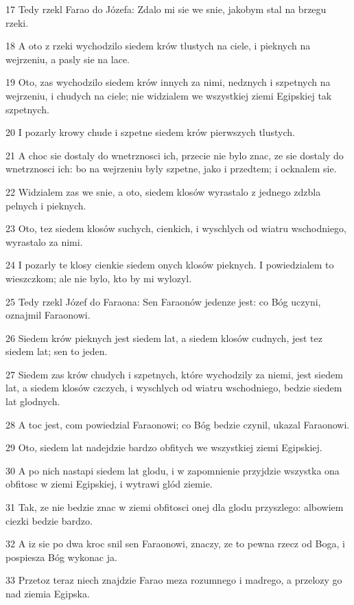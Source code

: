 \par 17 Tedy rzekl Farao do Józefa: Zdalo mi sie we snie, jakobym stal na brzegu rzeki.
\par 18 A oto z rzeki wychodzilo siedem krów tlustych na ciele, i pieknych na wejrzeniu, a pasly sie na lace.
\par 19 Oto, zas wychodzilo siedem krów innych za nimi, nedznych i szpetnych na wejrzeniu, i chudych na ciele; nie widzialem we wszystkiej ziemi Egipskiej tak szpetnych.
\par 20 I pozarly krowy chude i szpetne siedem krów pierwszych tlustych.
\par 21 A choc sie dostaly do wnetrznosci ich, przecie nie bylo znac, ze sie dostaly do wnetrznosci ich: bo na wejrzeniu byly szpetne, jako i przedtem; i ocknalem sie.
\par 22 Widzialem zas we snie, a oto, siedem klosów wyrastalo z jednego zdzbla pelnych i pieknych.
\par 23 Oto, tez siedem klosów suchych, cienkich, i wyschlych od wiatru wschodniego, wyrastalo za nimi.
\par 24 I pozarly te klosy cienkie siedem onych klosów pieknych. I powiedzialem to wieszczkom; ale nie bylo, kto by mi wylozyl.
\par 25 Tedy rzekl Józef do Faraona: Sen Faraonów jedenze jest: co Bóg uczyni, oznajmil Faraonowi.
\par 26 Siedem krów pieknych jest siedem lat, a siedem klosów cudnych, jest tez siedem lat; sen to jeden.
\par 27 Siedem zas krów chudych i szpetnych, które wychodzily za niemi, jest siedem lat, a siedem klosów czczych, i wyschlych od wiatru wschodniego, bedzie siedem lat glodnych.
\par 28 A toc jest, com powiedzial Faraonowi; co Bóg bedzie czynil, ukazal Faraonowi.
\par 29 Oto, siedem lat nadejdzie bardzo obfitych we wszystkiej ziemi Egipskiej.
\par 30 A po nich nastapi siedem lat glodu, i w zapomnienie przyjdzie wszystka ona obfitosc w ziemi Egipskiej, i wytrawi glód ziemie.
\par 31 Tak, ze nie bedzie znac w ziemi obfitosci onej dla glodu przyszlego: albowiem ciezki bedzie bardzo.
\par 32 A iz sie po dwa kroc snil sen Faraonowi, znaczy, ze to pewna rzecz od Boga, i pospiesza Bóg wykonac ja.
\par 33 Przetoz teraz niech znajdzie Farao meza rozumnego i madrego, a przelozy go nad ziemia Egipska.
